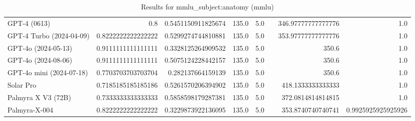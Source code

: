 \begin{table}[htp]
{\begin{tabular}{lrrrrrrr}
GPT-4 (0613) & 0.8 & 0.5451150911825674 & 135.0 & 5.0 &  & 346.97777777777776 & 1.0 \\
GPT-4 Turbo (2024-04-09) & 0.8222222222222222 & 0.5299274744810881 & 135.0 & 5.0 &  & 353.97777777777776 & 1.0 \\
GPT-4o (2024-05-13) & 0.9111111111111111 & 0.3328125264909532 & 135.0 & 5.0 &  & 350.6 & 1.0 \\
GPT-4o (2024-08-06) & 0.9111111111111111 & 0.5075124228442157 & 135.0 & 5.0 &  & 350.6 & 1.0 \\
GPT-4o mini (2024-07-18) & 0.7703703703703704 & 0.282137664159139 & 135.0 & 5.0 &  & 350.6 & 1.0 \\
Solar Pro & 0.7185185185185186 & 0.5261570206394902 & 135.0 & 5.0 &  & 418.1333333333333 & 1.0 \\
Palmyra X V3 (72B) & 0.7333333333333333 & 0.5858598179287381 & 135.0 & 5.0 &  & 372.0814814814815 & 1.0 \\
Palmyra-X-004 & 0.8222222222222222 & 0.3229873922136095 & 135.0 & 5.0 &  & 353.8740740740741 & 0.9925925925925926 \\
\bottomrule
\end{tabular}}
\caption{Results for mmlu_subject:anatomy (mmlu)}
\label{fig:mmlu_subject:anatomy (mmlu)}
\end{table}